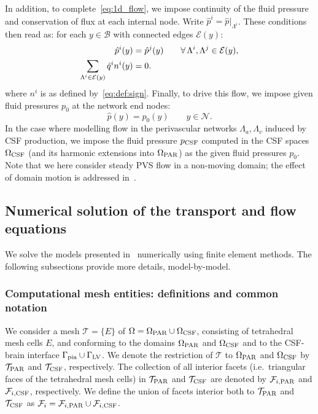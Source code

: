 \documentclass[fleqn,10pt]{wlscirep}
\begin{document}
In addition, to complete~\eqref{eq:1d_flow}, we impose continuity of
the fluid pressure and conservation of flux at each internal node. Write
$\hat{p}^i = \hat{p}|_{\Lambda^i}$. These conditions then read as: for
each $y \in \mathcal{B}$ with connected edges $\mathcal{E}(y)$:
\begin{subequations}
\begin{align}
  \hat{p}^i(y) &= \hat{p}^j(y) \qquad \forall \, \Lambda^i, \Lambda^j \in \mathcal{E}(y), \\
  \sum_{\Lambda^i \in \mathcal{E}(y)} \hat{q}^i n^i(y) &= 0  .
\end{align}
\label{eq:1d_flow:bifurcations}
\end{subequations}
where $n^i$ is as defined by~\eqref{eq:def:sign}. Finally, to drive this flow, we impose given fluid pressures $p_0$ at the
network end nodes:
\begin{equation}
  \hat{p}(y) = p_0(y) \qquad y \in \mathcal{N} .
  \label{eq:1d_flow:bcs}
\end{equation}
In the case where modelling flow in the perivascular networks
$\Lambda_a, \Lambda_v$ induced by CSF production, we impose the fluid
pressure $p_{\rm CSF}$ computed in the CSF spaces $\Omega_{\rm CSF}$
(and its harmonic extensions into $\Omega_{\rm PAR}$) as the given
fluid pressures $p_0$. Note that we here consider steady PVS flow in a
non-moving domain; the effect of domain motion is addressed
in~.

\subsection{Numerical solution of the transport and flow equations}
\label{sec:app:details_numerical_method}

We solve the models presented in~ numerically
using finite element methods. The following subsections provide more
details, model-by-model.

\subsubsection{Computational mesh entities: definitions and common notation}

We consider a mesh $\mathcal{T} = \{ E \}$ of $\Omega = \Omega_{\rm
  PAR} \cup \Omega_{\rm CSF}$, consisting of tetrahedral mesh cells
$E$, and conforming to the domains $\Omega_{\rm PAR}$ and $\Omega_{\rm
  CSF}$ and to the CSF-brain interface $\Gamma_{\rm pia} \cup
\Gamma_{\rm LV}$. We denote the restriction of $\mathcal{T}$ to
$\Omega_{\rm PAR}$ and $\Omega_{\rm CSF}$ by $\mathcal{T}_{\rm PAR}$
and $\mathcal{T}_{\rm CSF}$, respectively. The collection of all
interior facets (i.e.~triangular faces of the tetrahedral mesh cells)
in $\mathcal{T}_{\rm PAR}$ and $\mathcal{T}_{\rm CSF}$ are denoted by
$\mathcal{F}_{i, \rm PAR}$ and $\mathcal{F}_{i, \rm CSF}$,
respectively. We define the union of facets interior both to
$\mathcal{T}_{ \rm PAR}$ and $\mathcal{T}_{ \rm CSF}$ as
$\mathcal{F}_i = \mathcal{F}_{i, \rm PAR} \cup \mathcal{F}_{i, \rm
  CSF}$. 
\end{document}
